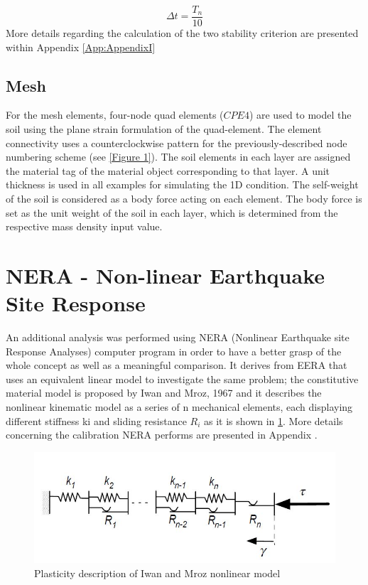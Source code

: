 	\begin{equation}
	\Delta t=\frac{T_n}{10}
	\end{equation}
	More details regarding the calculation of the two stability criterion are presented within Appendix \ref{App:AppendixI}
	
	\subsection{Mesh}
	For the mesh elements, four-node quad elements ($CPE4$) are used to model the soil using the plane strain formulation of the quad-element. The element connectivity uses a counterclockwise pattern for the previously-described node numbering scheme (see \ref{Figure 1}). The soil elements in each layer are assigned the material tag of the material object corresponding to that layer. A unit thickness is used in all examples for simulating the 1D condition. The self-weight of the soil is considered as a body force acting on each element. The body force is set as the unit weight of the soil in each layer, which is determined from the respective mass density input value.
	
	
	\section{NERA - Non-linear Earthquake Site Response}
	An additional analysis was performed using NERA (Nonlinear Earthquake site Response Analyses) computer program in order to have a better grasp of the whole concept as well as a meaningful comparison. It derives from EERA that uses an equivalent linear model to investigate the same problem; the constitutive material model is proposed by Iwan and Mroz, 1967 \cite{mroz1967description} and it describes the nonlinear kinematic model as a series of n mechanical elements, each displaying different stiffness ki and sliding resistance $R_i$ as it is shown in \ref{Mroz}. More details concerning the calibration NERA performs are presented in Appendix .
	
	\begin{figure}[h!]
		\centering
		\includegraphics[width=0.7\linewidth]{"Mroz"}
		\caption[]{Plasticity description of Iwan and Mroz nonlinear model}
		\label{Mroz}
	\end{figure}
	
